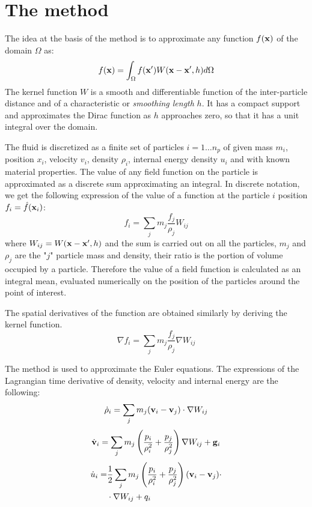 \documentclass[a4paper, 11pt, twocolumn]{article}
\begin{document}

\section{The method}
The idea at the basis of the method is to approximate any function $f({\bf x})$ of the domain $\Omega$ as:
\begin{equation}
f({\bf x}) = \int_\Omega f({\bf x'})W({\bf x} - {\bf x'}, h) d\Omega
\end{equation}
The kernel function $W$ is a smooth and differentiable function of the inter-particle distance and of a characteristic or \textit{smoothing length} $h$. It has a compact support and approximates the Dirac function as $h$ approaches zero, so that it has a unit integral over the domain.

The fluid is discretized as a finite set of particles $i = 1 \ldots n_p$ of given mass $m_i$, position $x_i$, velocity $v_i$, density $\rho_i$, internal energy density $u_i$ and with known material properties. The value of any field function on the particle is approximated as a discrete sum approximating an integral. In discrete notation, we get the following expression of the value of a function at the particle $i$ position $f_i = {\hat f}({\bf x}_i)$:
\begin{equation}
f_i = \sum_j m_j \frac{f_j}{\rho_j}W_{ij}
\end{equation}
where $W_{ij} = W({\bf x} - {\bf x'}, h)$ and the sum is carried out on all the particles, $m_j$ and $\rho_j$ are the "$j$" particle mass and density, their ratio is the portion of volume occupied by a particle. Therefore the value of a field function is calculated as an integral mean, evaluated numerically on the position of the particles around the point of interest.

The spatial derivatives of the function are obtained similarly by deriving the kernel function. 
\begin{equation}
\nabla f_i = \sum_j m_j \frac{f_j}{\rho_j} \nabla W_{ij}
\end{equation}

The method is used to approximate the Euler equations. The expressions of the Lagrangian time derivative of density, velocity and internal energy are the following:
\begin{equation}
\dot \rho_i = \sum_j m_j ({\bf v}_i - {\bf v}_j) \cdot \nabla W_{ij} 
\end{equation}
\begin{equation}
\dot {\bf v}_i = \sum_j m_j \left(\frac{p_i}{\rho_i^2}+\frac{p_j}{\rho_j^2} \right) \nabla W_{ij} + {\bf g}_i 
\end{equation}
\begin{equation}
\begin{split}
\dot u_i = & \frac{1}{2} \sum_j m_j \left(\frac{p_i}{\rho_i^2}+\frac{p_j}{\rho_j^2} \right) ({\bf v}_i - {\bf v}_j) \cdot \\
& \cdot \nabla W_{ij} + q_i
\end{split}
\end{equation}
\end{document}
